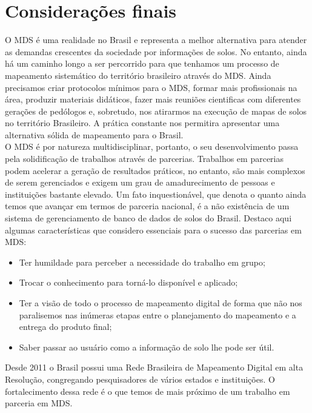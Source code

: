 \section{Considerações finais}
O MDS é uma realidade no Brasil e representa a melhor alternativa para atender as demandas crescentes da sociedade por informações de solos. No entanto, ainda há um caminho longo a ser percorrido para que tenhamos um processo de mapeamento sistemático do território brasileiro através do MDS. Ainda precisamos criar protocolos mínimos para o MDS, formar mais profissionais na área, produzir materiais didáticos, fazer mais reuniões cientificas com diferentes gerações de pedólogos e, sobretudo, nos atirarmos na execução de mapas de solos no território Brasileiro. A prática constante nos permitira apresentar uma alternativa sólida de mapeamento para o Brasil.\\
O MDS é por natureza multidisciplinar, portanto, o seu desenvolvimento passa pela solidificação de trabalhos através de parcerias. Trabalhos em parcerias podem acelerar a geração de resultados práticos, no entanto, são mais complexos de serem gerenciados e exigem um grau de amadurecimento de pessoas e instituições bastante elevado. Um fato inquestionável, que denota o quanto ainda temos que avançar em termos de parceria nacional, é a não existência de um sistema de gerenciamento de banco de dados de solos do Brasil. Destaco aqui algumas características que considero essenciais para o sucesso das parcerias em MDS:
\begin{itemize}
\item Ter humildade para perceber a necessidade do trabalho em grupo;
\item Trocar o conhecimento para torná-lo disponível e aplicado;
\item Ter a visão de todo o processo de mapeamento digital de forma que não nos paralisemos nas inúmeras etapas entre o planejamento do mapeamento e a entrega do produto final;
\item Saber passar ao usuário como a informação de solo lhe pode ser útil.
\end{itemize}
Desde 2011 o Brasil possui uma Rede Brasileira de Mapeamento Digital em alta Resolução, congregando pesquisadores de vários estados e instituições. O fortalecimento dessa rede é o que temos de mais próximo de um trabalho em parceria em MDS.
